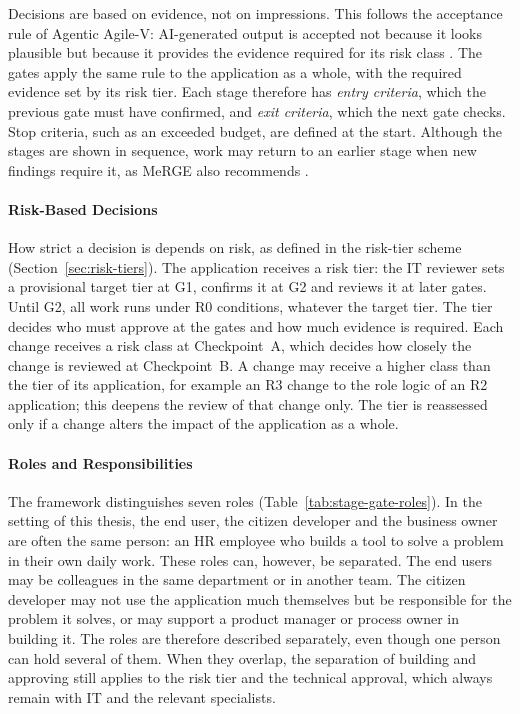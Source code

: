 \documentclass[10pt,a4paper]{article}
\begin{document}
Decisions are based on evidence, not on impressions. This follows the acceptance rule of Agentic Agile-V: AI-generated output is accepted not because it looks plausible but because it provides the evidence required for its risk class \parencite{koch2026agentic}. The gates apply the same rule to the application as a whole, with the required evidence set by its risk tier. Each stage therefore has \emph{entry criteria}, which the previous gate must have confirmed, and \emph{exit criteria}, which the next gate checks. Stop criteria, such as an exceeded budget, are defined at the start. Although the stages are shown in sequence, work may return to an earlier stage when new findings require it, as MeRGE also recommends \parencite{fetzer2026}.

\paragraph{Risk-Based Decisions}

How strict a decision is depends on risk, as defined in the risk-tier
scheme (Section~\ref{sec:risk-tiers}). The application receives a risk
tier: the IT reviewer sets a provisional target tier at G1, confirms it
at G2 and reviews it at later gates. Until G2, all work runs under R0
conditions, whatever the target tier. The tier decides who must approve
at the gates and how much evidence is required. Each change receives a
risk class at Checkpoint~A, which decides how closely the change is
reviewed at Checkpoint~B. A change may receive a higher class than the
tier of its application, for example an R3 change to the role logic of
an R2 application; this deepens the review of that change only. The tier
is reassessed only if a change alters the impact of the application as
a whole.

\paragraph{Roles and Responsibilities}

The framework distinguishes seven roles (Table~\ref{tab:stage-gate-roles}). In the setting of this thesis, the end user, the citizen developer and the business owner are often the same person: an HR employee who builds a tool to solve a problem in their own daily work. These roles can, however, be separated. The end users may be colleagues in the same department or in another team. The citizen developer may not use the application much themselves but be responsible for the problem it solves, or may support a product manager or process owner in building it. The roles are therefore described separately, even though one person can hold several of them. When they overlap, the separation of building and approving still applies to the risk tier and the technical approval, which always remain with IT and the relevant specialists.
\end{document}
